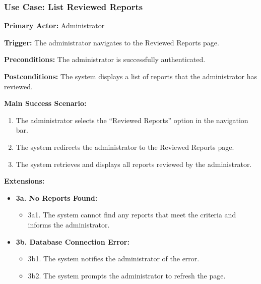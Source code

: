 \subsubsection{\textbf{Use Case: List Reviewed Reports}}

\textbf{Primary Actor:} Administrator

\textbf{Trigger:} The administrator navigates to the Reviewed Reports page.

\textbf{Preconditions:} The administrator is successfully authenticated.

\textbf{Postconditions:} The system displays a list of reports that the administrator has reviewed.

\vspace{0.5cm}

\textbf{Main Success Scenario:}

\begin{enumerate} [leftmargin=0.75cm, noitemsep]
\item The administrator selects the ``Reviewed Reports'' option in the navigation bar.
\item The system redirects the administrator to the Reviewed Reports page.
\item The system retrieves and displays all reports reviewed by the administrator.
\end{enumerate}

\vspace{0.3cm}

\textbf{Extensions:}

\begin{itemize} [label={}, leftmargin=0.75cm, noitemsep]

    \item \textbf{3a. No Reports Found:}
    \begin{itemize} [label={}, leftmargin=0.75cm, noitemsep]
        \item 3a1. The system cannot find any reports that meet the criteria and informs the administrator.
    \end{itemize}

    \item \textbf{3b. Database Connection Error:}
    \begin{itemize} [label={}, leftmargin=0.75cm, noitemsep]
        \item 3b1. The system notifies the administrator of the error.
        \item 3b2. The system prompts the administrator to refresh the page.
    \end{itemize}

\end{itemize}

\vspace{0.3cm}
